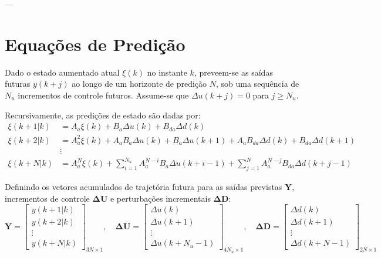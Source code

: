 \documentclass[12pt,journal,onecolumn]{article}
\begin{document}
---

\section{Equações de Predição}

Dado o estado aumentado atual $\xi(k)$ no instante $k$, preveem-se as saídas futuras $y(k+j)$ ao longo de um horizonte de predição $N$, sob uma sequência de $N_u$ incrementos de controle futuros. Assume-se que $\Delta u(k+j) = 0$ para $j \ge N_u$. 

Recursivamente, as predições de estado são dadas por:
\begin{align}
\xi(k+1|k) &= A_a \xi(k) + B_a \Delta u(k) + B_{da} \Delta d(k) \nonumber \\
\xi(k+2|k) &= A_a^2 \xi(k) + A_a B_a \Delta u(k) + B_a \Delta u(k+1) + A_a B_{da} \Delta d(k) + B_{da} \Delta d(k+1) \nonumber \\
&\vdots \nonumber \\
\xi(k+N|k) &= A_a^N \xi(k) + \sum_{i=1}^{N_u} A_a^{N-i} B_a \Delta u(k+i-1) + \sum_{j=1}^N A_a^{N-j} B_{da} \Delta d(k+j-1)
\end{align}

Definindo os vetores acumulados de trajetória futura para as saídas previstas $\bm{Y}$, incrementos de controle $\bm{\Delta U}$ e perturbações incrementais $\bm{\Delta D}$:
\begin{equation}
\bm{Y} = \begin{bmatrix} y(k+1|k) \\ y(k+2|k) \\ \vdots \\ y(k+N|k) \end{bmatrix}_{3N \times 1}, \quad
\bm{\Delta U} = \begin{bmatrix} \Delta u(k) \\ \Delta u(k+1) \\ \vdots \\ \Delta u(k+N_u-1) \end{bmatrix}_{4N_u \times 1}, \quad
\bm{\Delta D} = \begin{bmatrix} \Delta d(k) \\ \Delta d(k+1) \\ \vdots \\ \Delta d(k+N-1) \end{bmatrix}_{2N \times 1}
\end{equation}
\end{document}
